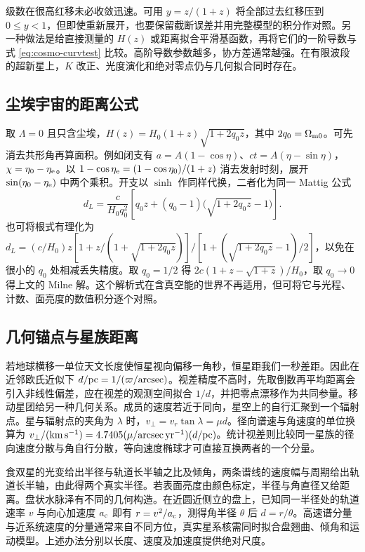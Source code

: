 级数在很高红移未必收敛迅速。可用 $y=z/(1+z)$ 将全部过去红移压到 $0\leq y<1$，但即使重新展开，也要保留截断误差并用完整模型的积分作对照。另一种做法是给直接测量的 $H(z)$ 或距离拟合平滑基函数，再将它们的一阶导数与式 \eqref{eq:cosmo-curvtest} 比较。高阶导数参数越多，协方差通常越强。在有限波段的超新星上，$K$ 改正、光度演化和绝对零点仍与几何拟合同时存在。

\subsection{尘埃宇宙的距离公式}

取 $\Lambda=0$ 且只含尘埃，$H(z)=H_0(1+z)\sqrt{1+2q_0z}$，其中 $2q_0=\Omega_{\rm m0}$。可先消去共形角再算面积。例如闭支有 $a=A(1-\cos\eta)$、$ct=A(\eta-\sin\eta)$，$\chi=\eta_0-\eta_{\rm e}$。以 $1-\cos\eta_{\rm e}=(1-\cos\eta_0)/(1+z)$ 消去发射时刻，展开 $\sin(\eta_0-\eta_{\rm e})$ 中两个乘积。开支以 $\sinh$ 作同样代换，二者化为同一 Mattig 公式
\[
 d_L=\frac{c}{H_0q_0^2}
       \left[q_0z+(q_0-1)\big(\sqrt{1+2q_0z}-1\big)\right].
\]
也可将根式有理化为 $d_L=(c/H_0)z[1+z/(1+\sqrt{1+2q_0z})]/[1+(\sqrt{1+2q_0z}-1)/2]$，以免在很小的 $q_0$ 处相减丢失精度。取 $q_0=1/2$ 得 $2c(1+z-\sqrt{1+z})/H_0$，取 $q_0\to0$ 得上文的 Milne 解。这个解析式在含真空能的世界不再适用，但可将它与光程、计数、面亮度的数值积分逐个对照。

\subsection{几何锚点与星族距离}

若地球横移一单位天文长度使恒星视向偏移一角秒，恒星距我们一秒差距。因此在近邻欧氏近似下 $d/{\rm pc}=1/(\varpi/{\rm arcsec})$。视差精度不高时，先取倒数再平均距离会引入非线性偏差，应在视差的观测空间拟合 $1/d$，并把零点漂移作为共同参量。移动星团给另一种几何关系。成员的速度若近于同向，星空上的自行汇聚到一个辐射点。星与辐射点的夹角为 $\lambda$ 时，$v_\perp=v_r\tan\lambda=\mu d$。径向谱速与角速度的单位换算为 $v_\perp/({\rm km\,s^{-1}})=4.7405(\mu/{\rm arcsec\,yr^{-1}})(d/{\rm pc})$。统计视差则比较同一星族的径向速度分散与角自行分散，等向速度椭球才可直接互换两者的一个分量。

食双星的光变给出半径与轨道长半轴之比及倾角，两条谱线的速度幅与周期给出轨道长半轴，由此得两个真实半径。若表面亮度由颜色标定，半径与角直径又给距离。盘状水脉泽有不同的几何构造。在近圆近侧立的盘上，已知同一半径处的轨道速率 $v$ 与向心加速度 $a_{\rm c}$ 即有 $r=v^2/a_{\rm c}$，测得角半径 $\theta$ 后 $d=r/\theta$。高速谱分量与近系统速度的分量通常来自不同方位，真实星系核需同时拟合盘翘曲、倾角和运动模型。上述办法分别以长度、速度及加速度提供绝对尺度。

